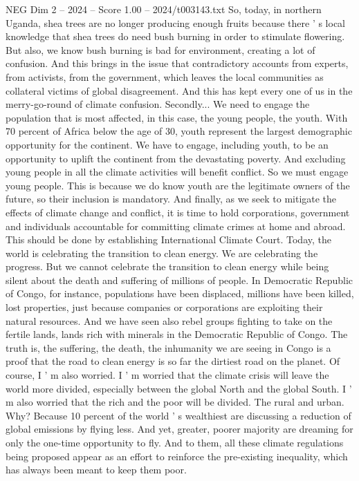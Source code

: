 \begin{textsample}{NEG Dim 2 – 2024 – Score 1.00 – 2024/t003143.txt}
So, today, in northern Uganda, shea trees are no longer producing enough fruits because there ' s local knowledge that shea trees do need bush burning in order to stimulate flowering.
But also, we know bush burning is bad for environment, creating a lot of confusion.
And this brings in the issue that contradictory accounts from experts, from activists, from the government, which leaves the local communities as collateral victims of global disagreement.
And this has kept every one of us in the merry-go-round of climate confusion.
Secondly...
We need to engage the population that is most affected, in this case, the young people, the youth.
With 70 percent of Africa below the age of 30, youth represent the largest demographic opportunity for the continent.
We have to engage, including youth, to be an opportunity to uplift the continent from the devastating poverty.
And excluding young people in all the climate activities will benefit conflict.
So we must engage young people.
This is because we do know youth are the legitimate owners of the future, so their inclusion is mandatory.
And finally, as we seek to mitigate the effects of climate change and conflict, it is time to hold corporations, government and individuals accountable for committing climate crimes at home and abroad.
This should be done by establishing International Climate Court.
Today, the world is celebrating the transition to clean energy.
We are celebrating the progress.
But we cannot celebrate the transition to clean energy while being silent about the death and suffering of millions of people.
In Democratic Republic of Congo, for instance, populations have been displaced, millions have been killed, lost properties, just because companies or corporations are exploiting their natural resources.
And we have seen also rebel groups fighting to take on the fertile lands, lands rich with minerals in the Democratic Republic of Congo.
The truth is, the suffering, the death, the inhumanity we are seeing in Congo is a proof that the road to clean energy is so far the dirtiest road on the planet.
Of course, I ' m also worried.
I ' m worried that the climate crisis will leave the world more divided, especially between the global North and the global South.
I ' m also worried that the rich and the poor will be divided.
The rural and urban.
Why?
Because 10 percent of the world ' s wealthiest are discussing a reduction of global emissions by flying less.
And yet, greater, poorer majority are dreaming for only the one-time opportunity to fly.
And to them, all these climate regulations being proposed appear as an effort to reinforce the pre-existing inequality, which has always been meant to keep them poor.

\end{textsample}
